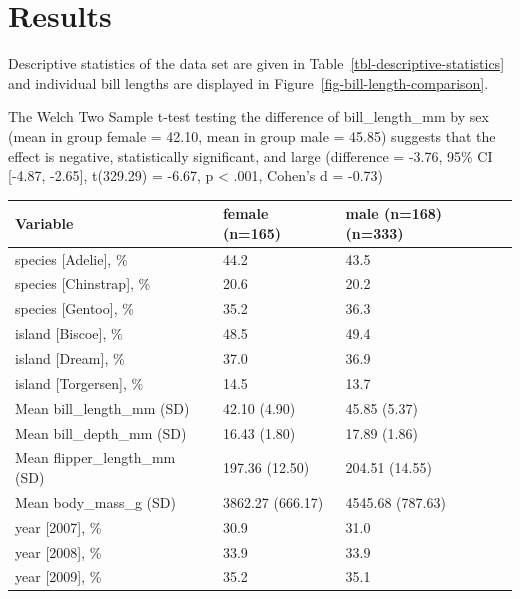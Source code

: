 \documentclass[
  man,
  longtable,
  a4paper,
  nolmodern,
  notxfonts,
  notimes,
  colorlinks=true,linkcolor=blue,citecolor=blue,urlcolor=blue]{apa7}
\begin{document}
\section{Results}\label{results}

Descriptive statistics of the data set are given in
Table~\ref{tbl-descriptive-statistics} and individual bill lengths are
displayed in Figure~\ref{fig-bill-length-comparison}.

The Welch Two Sample t-test testing the difference of bill\_length\_mm
by sex (mean in group female = 42.10, mean in group male = 45.85)
suggests that the effect is negative, statistically significant, and
large (difference = -3.76, 95\% CI {[}-4.87, -2.65{]}, t(329.29) =
-6.67, p \textless{} .001, Cohen's d = -0.73)

\begin{table}

{\caption{{Descriptive Statistics}{\label{tbl-descriptive-statistics}}}
\vspace{-20pt}}

\begin{longtable}[]{@{}lll@{}}
\toprule\noalign{}
Variable & female (n=165) & male (n=168) (n=333) \\
\midrule\noalign{}
\endhead
\bottomrule\noalign{}
\endlastfoot
species {[}Adelie{]}, \% & 44.2 & 43.5 \\
species {[}Chinstrap{]}, \% & 20.6 & 20.2 \\
species {[}Gentoo{]}, \% & 35.2 & 36.3 \\
island {[}Biscoe{]}, \% & 48.5 & 49.4 \\
island {[}Dream{]}, \% & 37.0 & 36.9 \\
island {[}Torgersen{]}, \% & 14.5 & 13.7 \\
Mean bill\_length\_mm (SD) & 42.10 (4.90) & 45.85 (5.37) \\
Mean bill\_depth\_mm (SD) & 16.43 (1.80) & 17.89 (1.86) \\
Mean flipper\_length\_mm (SD) & 197.36 (12.50) & 204.51 (14.55) \\
Mean body\_mass\_g (SD) & 3862.27 (666.17) & 4545.68 (787.63) \\
year {[}2007{]}, \% & 30.9 & 31.0 \\
year {[}2008{]}, \% & 33.9 & 33.9 \\
year {[}2009{]}, \% & 35.2 & 35.1 \\
\end{longtable}

\end{table}
\end{document}
